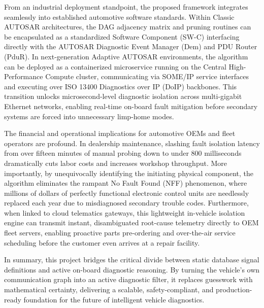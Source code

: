 \documentclass[11pt,a4paper]{article}
\begin{document}
From an industrial deployment standpoint, the proposed framework integrates seamlessly into established automotive software standards. Within Classic AUTOSAR architectures, the DAG adjacency matrix and pruning routines can be encapsulated as a standardized Software Component (SW-C) interfacing directly with the AUTOSAR Diagnostic Event Manager (Dem) and PDU Router (PduR). In next-generation Adaptive AUTOSAR environments, the algorithm can be deployed as a containerized microservice running on the Central High-Performance Compute cluster, communicating via SOME/IP service interfaces and executing over ISO 13400 Diagnostics over IP (DoIP) backbones. This transition unlocks microsecond-level diagnostic isolation across multi-gigabit Ethernet networks, enabling real-time on-board fault mitigation before secondary systems are forced into unnecessary limp-home modes.

The financial and operational implications for automotive OEMs and fleet operators are profound. In dealership maintenance, slashing fault isolation latency from over fifteen minutes of manual probing down to under 800 milliseconds dramatically cuts labor costs and increases workshop throughput. More importantly, by unequivocally identifying the initiating physical component, the algorithm eliminates the rampant No Fault Found (NFF) phenomenon, where millions of dollars of perfectly functional electronic control units are needlessly replaced each year due to misdiagnosed secondary trouble codes. Furthermore, when linked to cloud telematics gateways, this lightweight in-vehicle isolation engine can transmit instant, disambiguated root-cause telemetry directly to OEM fleet servers, enabling proactive parts pre-ordering and over-the-air service scheduling before the customer even arrives at a repair facility.

In summary, this project bridges the critical divide between static database signal definitions and active on-board diagnostic reasoning. By turning the vehicle's own communication graph into an active diagnostic filter, it replaces guesswork with mathematical certainty, delivering a scalable, safety-compliant, and production-ready foundation for the future of intelligent vehicle diagnostics.
\end{document}
